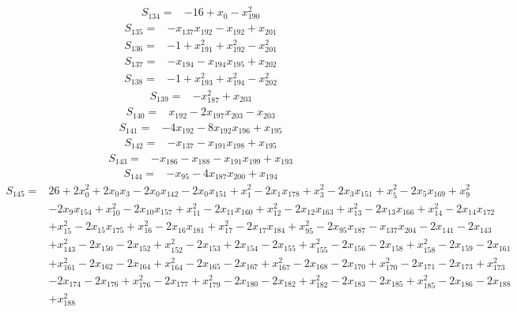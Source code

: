 \begin{align*}
S_{134}={}&-16+x_{0}-x_{190}^{2}
\end{align*}
\begin{align*}
S_{135}={}&-x_{137}x_{192}-x_{192}+x_{201}
\end{align*}
\begin{align*}
S_{136}={}&-1+x_{191}^{2}+x_{192}^{2}-x_{201}^{2}
\end{align*}
\begin{align*}
S_{137}={}&-x_{194}-x_{194}x_{195}+x_{202}
\end{align*}
\begin{align*}
S_{138}={}&-1+x_{193}^{2}+x_{194}^{2}-x_{202}^{2}
\end{align*}
\begin{align*}
S_{139}={}&-x_{187}^{2}+x_{203}
\end{align*}
\begin{align*}
S_{140}={}&x_{192}-2x_{197}x_{203}-x_{203}
\end{align*}
\begin{align*}
S_{141}={}&-4x_{192}-8x_{192}x_{196}+x_{195}
\end{align*}
\begin{align*}
S_{142}={}&-x_{137}-x_{191}x_{198}+x_{195}
\end{align*}
\begin{align*}
S_{143}={}&-x_{186}-x_{188}-x_{191}x_{199}+x_{193}
\end{align*}
\begin{align*}
S_{144}={}&-x_{95}-4x_{187}x_{200}+x_{194}
\end{align*}
\begin{align*}
S_{145}={}&26+2x_{0}^{2}+2x_{0}x_{3}-2x_{0}x_{142}-2x_{0}x_{151}+x_{1}^{2}-2x_{1}x_{178}+x_{3}^{2}-2x_{3}x_{151}+x_{5}^{2}-2x_{5}x_{169}+x_{9}^{2}\\
{}&-2x_{9}x_{154}+x_{10}^{2}-2x_{10}x_{157}+x_{11}^{2}-2x_{11}x_{160}+x_{12}^{2}-2x_{12}x_{163}+x_{13}^{2}-2x_{13}x_{166}+x_{14}^{2}-2x_{14}x_{172}\\
{}&+x_{15}^{2}-2x_{15}x_{175}+x_{16}^{2}-2x_{16}x_{181}+x_{17}^{2}-2x_{17}x_{184}+x_{95}^{2}-2x_{95}x_{187}-x_{137}x_{204}-2x_{141}-2x_{143}\\
{}&+x_{143}^{2}-2x_{150}-2x_{152}+x_{152}^{2}-2x_{153}+2x_{154}-2x_{155}+x_{155}^{2}-2x_{156}-2x_{158}+x_{158}^{2}-2x_{159}-2x_{161}\\
{}&+x_{161}^{2}-2x_{162}-2x_{164}+x_{164}^{2}-2x_{165}-2x_{167}+x_{167}^{2}-2x_{168}-2x_{170}+x_{170}^{2}-2x_{171}-2x_{173}+x_{173}^{2}\\
{}&-2x_{174}-2x_{176}+x_{176}^{2}-2x_{177}+x_{179}^{2}-2x_{180}-2x_{182}+x_{182}^{2}-2x_{183}-2x_{185}+x_{185}^{2}-2x_{186}-2x_{188}\\
{}&+x_{188}^{2}
\end{align*}
